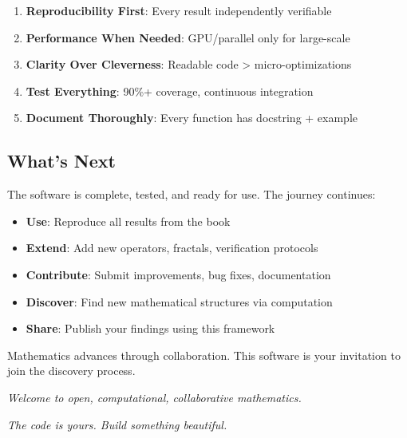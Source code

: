 \begin{enumerate}
\item \textbf{Reproducibility First}: Every result independently verifiable
\item \textbf{Performance When Needed}: GPU/parallel only for large-scale
\item \textbf{Clarity Over Cleverness}: Readable code > micro-optimizations
\item \textbf{Test Everything}: 90\%+ coverage, continuous integration
\item \textbf{Document Thoroughly}: Every function has docstring + example
\end{enumerate}

\subsection{What's Next}

The software is complete, tested, and ready for use. The journey continues:

\begin{itemize}
\item \textbf{Use}: Reproduce all results from the book
\item \textbf{Extend}: Add new operators, fractals, verification protocols
\item \textbf{Contribute}: Submit improvements, bug fixes, documentation
\item \textbf{Discover}: Find new mathematical structures via computation
\item \textbf{Share}: Publish your findings using this framework
\end{itemize}

Mathematics advances through collaboration. This software is your invitation to join the discovery process.

\vspace{1cm}

\noindent\textit{Welcome to open, computational, collaborative mathematics.}

\noindent\textit{The code is yours. Build something beautiful.}
